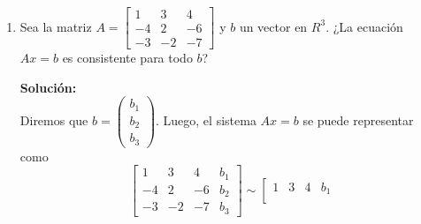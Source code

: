 \documentclass[12pt]{article}
\newenvironment{solucion}
{\begin{mdframed}[backgroundcolor=black!10]
		{\bf Solución:}\\
	}
	{
	\end{mdframed}
}
\newenvironment{preguntas}
{\begin{enumerate}\itemsep12pt
	}
	{
	\end{enumerate}
}
\newcommand{\ra}{\rightarrow}
\newcommand{\widesim}[2][1.5]{
	\mathrel{\overset{#2}{\scalebox{#1}[1]{$\sim$}}}
}
\newcommand{\wsim}{\widesim{}}
\begin{document}
\begin{preguntas}
\begin{solucion}
\begin{enumerate}[a)]
$$\begin{bmatrix}
0 & 0 & 0 & 0
\end{bmatrix}
\stackbin[F_3 \leftarrow \frac{1}{1-a}F_3]{F_2 \leftarrow \frac{1}{-1-a}F_2}{\wsim}
\begin{bmatrix}
1 & 1 & 1 & 1\\
0 & 1 & 0 & \frac{1}{1+a}\\
0 & 0 & 1 & 0\\
0 & 0 & 0 & 0
\end{bmatrix}
\stackbin[F_1-F_3]{F_1 - F_2}{\wsim}
\begin{bmatrix}
1 & 0 & 0 & \frac{a}{1+a}\\
0 & 1 & 0 & \frac{1}{1+a}\\
0 & 0 & 1 & 0\\
0 & 0 & 0 & 0
\end{bmatrix}$$
Luego,
$$\begin{array}{rcl}
x_1 & = & \dfrac{a}{1+a}\\
x_2 & = & \dfrac{1}{1+a}\\
x_3 & = & 0 
\end{array} \ra 
x = \begin{pmatrix}
\frac{a}{1+a} \\
\frac{1}{1+a} \\
0
\end{pmatrix}$$
Notemos que esta última corresponde siempre a una solución única pero que depende de $a$.
\end{enumerate}
\end{solucion}
\item Sea la matriz $A=
	\begin{bmatrix}
	1 & 3 & 4\\
	-4 & 2 & -6\\
	-3 & -2 & -7
	\end{bmatrix}
	$ y $b$ un vector en $R^3$. ¿La ecuación $Ax=b$ es consistente para todo $b$?
\begin{solucion}
Diremos que $b = \begin{pmatrix}
	b_1 \\ b_2 \\ b_3
	\end{pmatrix}$. Luego, el sistema $Ax = b$ se puede representar como
	$$\left[
	\begin{array}{ccc|c}
	1 & 3 & 4 &b_1\\
	-4 & 2 & -6 & b_2\\
	-3 & -2 & -7 & b_3
	\end{array}
	\right] \sim \left[
	\begin{array}{ccc|c}
	1 & 3 & 4 &b_1\\

\end{array}$$
\end{solucion}
\end{preguntas}
\end{document}
